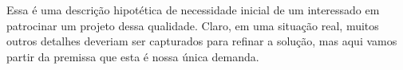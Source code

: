     Essa é uma descrição hipotética de necessidade inicial de um interessado em patrocinar um projeto dessa qualidade. Claro, em uma situação real, muitos outros detalhes deveriam ser capturados para refinar a solução, mas aqui vamos partir da premissa que esta é nossa única demanda.

  
